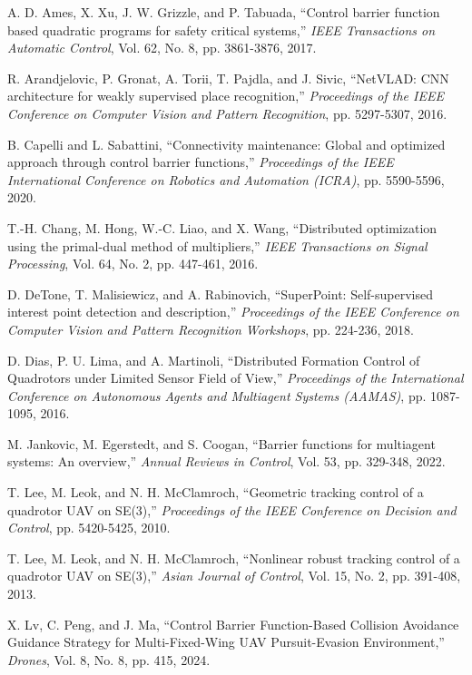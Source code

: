 \begin{thebibliography}{99}
 A. D. Ames, X. Xu, J. W. Grizzle, and P. Tabuada, ``Control barrier function based quadratic programs for safety critical systems,'' {\it IEEE Transactions on Automatic Control}, Vol. 62, No. 8, pp. 3861-3876, 2017.

 R. Arandjelovic, P. Gronat, A. Torii, T. Pajdla, and J. Sivic, ``NetVLAD: CNN architecture for weakly supervised place recognition,'' {\it Proceedings of the IEEE Conference on Computer Vision and Pattern Recognition}, pp. 5297-5307, 2016.

 B. Capelli and L. Sabattini, ``Connectivity maintenance: Global and optimized approach through control barrier functions,'' {\it Proceedings of the IEEE International Conference on Robotics and Automation (ICRA)}, pp. 5590-5596, 2020.

 T.-H. Chang, M. Hong, W.-C. Liao, and X. Wang, ``Distributed optimization using the primal-dual method of multipliers,'' {\it IEEE Transactions on Signal Processing}, Vol. 64, No. 2, pp. 447-461, 2016.

 D. DeTone, T. Malisiewicz, and A. Rabinovich, ``SuperPoint: Self-supervised interest point detection and description,'' {\it Proceedings of the IEEE Conference on Computer Vision and Pattern Recognition Workshops}, pp. 224-236, 2018.

 D. Dias, P. U. Lima, and A. Martinoli, ``Distributed Formation Control of Quadrotors under Limited Sensor Field of View,'' {\it Proceedings of the International Conference on Autonomous Agents and Multiagent Systems (AAMAS)}, pp. 1087-1095, 2016.

 M. Jankovic, M. Egerstedt, and S. Coogan, ``Barrier functions for multiagent systems: An overview,'' {\it Annual Reviews in Control}, Vol. 53, pp. 329-348, 2022.

 T. Lee, M. Leok, and N. H. McClamroch, ``Geometric tracking control of a quadrotor UAV on SE(3),'' {\it Proceedings of the IEEE Conference on Decision and Control}, pp. 5420-5425, 2010.

 T. Lee, M. Leok, and N. H. McClamroch, ``Nonlinear robust tracking control of a quadrotor UAV on SE(3),'' {\it Asian Journal of Control}, Vol. 15, No. 2, pp. 391-408, 2013.

 X. Lv, C. Peng, and J. Ma, ``Control Barrier Function-Based Collision Avoidance Guidance Strategy for Multi-Fixed-Wing UAV Pursuit-Evasion Environment,'' {\it Drones}, Vol. 8, No. 8, pp. 415, 2024.


\end{thebibliography}
